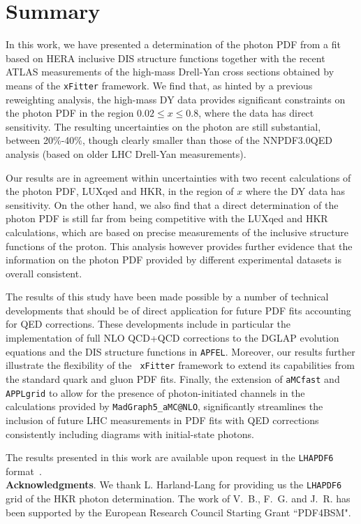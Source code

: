 \section{Summary}
\label{sec:conclusions}

%
In this work, we have presented a determination of the photon PDF from
a fit based on HERA inclusive DIS structure functions together with
the recent ATLAS measurements of the high-mass Drell-Yan cross
sections obtained by means of the {\tt xFitter} framework.
%
We find that, as hinted by a previous reweighting analysis, the
high-mass DY data provides significant constraints on the photon PDF
in the region $0.02 \le x \le 0.8$, where the data has direct
sensitivity.
%
The resulting uncertainties on the photon are still substantial,
between 20\%-40\%, though clearly smaller than those of the
NNPDF3.0QED analysis (based on older LHC Drell-Yan measurements).

Our results are in agreement within uncertainties with two recent
calculations of the photon PDF, LUXqed and HKR, in the region of $x$
where the DY data has sensitivity.
%
On the other hand, we also find that a direct determination of the
photon PDF is still far from being competitive with the LUXqed and HKR
calculations, which are based on precise measurements of the inclusive
structure functions of the proton.
%
This analysis however provides further evidence that the information
on the photon PDF provided by different experimental datasets is
overall consistent.

The results of this study have been made possible by a number of
technical developments that should be of direct application for future
PDF fits accounting for QED corrections.
%
These developments include in particular the implementation of full NLO
QCD+QCD corrections to the DGLAP evolution equations and the DIS
structure functions in {\tt APFEL}.
%
Moreover, our results further illustrate the flexibility of the {\tt
  xFitter} framework to extend its capabilities from the standard
quark and gluon PDF fits.
%
Finally, the extension of {\tt aMCfast} and {\tt APPLgrid} to allow
for the presence of photon-initiated channels in the calculations
provided by {\tt MadGraph5\_aMC@NLO}, significantly streamlines the
inclusion of future LHC measurements in PDF fits with QED corrections
consistently including diagrams with initial-state photons.

The results presented in this work are available upon
request in the {\tt LHAPDF6} format~\cite{Buckley:2014ana}.\\

{\bf Acknowledgments}.
%
We thank L. Harland-Lang for providing us the {\tt LHAPDF6} grid of
the HKR photon determination.
%
The work of V.~B., F.~G. and J.~R. has been supported by the European
Research Council Starting Grant ``PDF4BSM".



